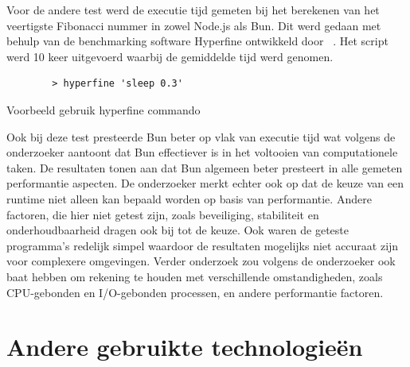 Voor de andere test werd de executie tijd gemeten bij het berekenen van het veertigste Fibonacci nummer in zowel Node.js als Bun. 
Dit werd gedaan met behulp van de benchmarking software Hyperfine ontwikkeld door ~\textcite{Pompeii2024}. 
Het script werd 10 keer uitgevoerd waarbij de gemiddelde tijd werd genomen.
\begin{listing}[H]
    \centering
    \begin{verbatim}
        > hyperfine 'sleep 0.3'
        \end{verbatim}
        \caption{Voorbeeld gebruik hyperfine commando \autocite{Pompeii2024}}
\end{listing}
Ook bij deze test presteerde Bun beter op vlak van executie tijd wat volgens de onderzoeker aantoont dat Bun effectiever is in het voltooien van computationele taken.
De resultaten tonen aan dat 
Bun algemeen beter presteert in alle gemeten performantie aspecten.
De onderzoeker merkt echter ook op dat de keuze van een runtime niet alleen kan bepaald worden op basis van 
performantie. Andere factoren, die hier niet getest zijn, zoals beveiliging, stabiliteit en onderhoudbaarheid dragen ook bij tot de keuze. 
Ook waren de geteste programma's redelijk simpel waardoor de resultaten mogelijks niet accuraat zijn voor complexere omgevingen. 
Verder onderzoek zou volgens de onderzoeker ook baat hebben om rekening te houden met verschillende omstandigheden, zoals CPU-gebonden
en I/O-gebonden processen, en andere performantie factoren.

\section{Andere gebruikte technologieën}

